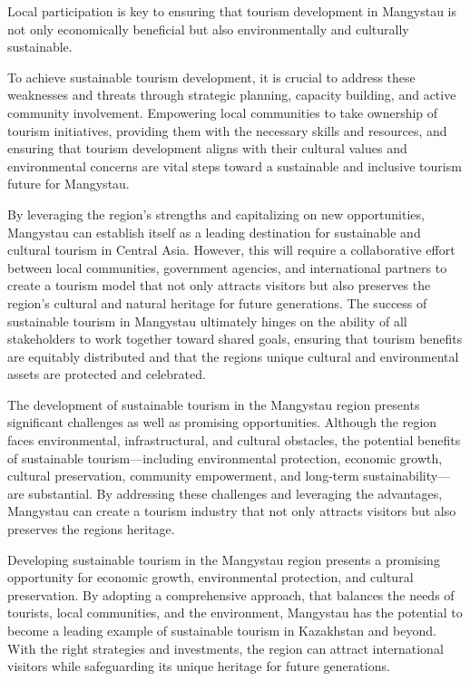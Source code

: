 Local participation is key to ensuring that tourism development in
Mangystau is not only economically beneficial but also environmentally
and culturally sustainable.

To achieve sustainable tourism development, it is crucial to address
these weaknesses and threats through strategic planning, capacity
building, and active community involvement. Empowering local communities
to take ownership of tourism initiatives, providing them with the
necessary skills and resources, and ensuring that tourism development
aligns with their cultural values and environmental concerns are vital
steps toward a sustainable and inclusive tourism future for Mangystau.

By leveraging the region's strengths and capitalizing on new
opportunities, Mangystau can establish itself as a leading destination
for sustainable and cultural tourism in Central Asia. However, this will
require a collaborative effort between local communities, government
agencies, and international partners to create a tourism model that not
only attracts visitors but also preserves the region's cultural and
natural heritage for future generations. The success of sustainable
tourism in Mangystau ultimately hinges on the ability of all
stakeholders to work together toward shared goals, ensuring that tourism
benefits are equitably distributed and that the region\textquotesingle s
unique cultural and environmental assets are protected and celebrated.

The development of sustainable tourism in the Mangystau region presents
significant challenges as well as promising opportunities. Although the
region faces environmental, infrastructural, and cultural obstacles, the
potential benefits of sustainable tourism---including environmental
protection, economic growth, cultural preservation, community
empowerment, and long-term sustainability---are substantial. By
addressing these challenges and leveraging the advantages, Mangystau can
create a tourism industry that not only attracts visitors but also
preserves the region\textquotesingle s heritage.

Developing sustainable tourism in the Mangystau region presents a
promising opportunity for economic growth, environmental protection, and
cultural preservation. By adopting a comprehensive approach, that
balances the needs of tourists, local communities, and the environment,
Mangystau has the potential to become a leading example of sustainable
tourism in Kazakhstan and beyond. With the right strategies and
investments, the region can attract international visitors while
safeguarding its unique heritage for future generations.

